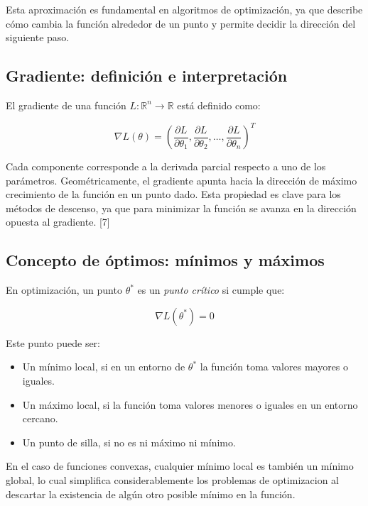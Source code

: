 \documentclass[12pt, letterpaper,conference]{IEEEtran}
\begin{document}
Esta aproximación es fundamental en algoritmos de optimización, ya que describe cómo cambia la función alrededor de un punto y permite decidir la dirección del siguiente paso.

\vspace{0.25cm}


\subsection{Gradiente: definición e interpretación}

El gradiente de una función \( L: \mathbb{R}^n \rightarrow \mathbb{R} \) está definido como:

\[
\nabla L(\theta) = \left( \frac{\partial L}{\partial \theta_1}, \frac{\partial L}{\partial \theta_2}, \dots, \frac{\partial L}{\partial \theta_n} \right)^T
\]

Cada componente corresponde a la derivada parcial respecto a uno de los parámetros. Geométricamente, el gradiente apunta hacia la dirección de máximo crecimiento de la función en un punto dado. Esta propiedad es clave para los métodos de descenso, ya que para minimizar la función se avanza en la dirección opuesta al gradiente. [7]

\vspace{0.25cm}


\subsection{Concepto de óptimos: mínimos y máximos}

En optimización, un punto \( \theta^* \) es un \textit{punto crítico} si cumple que:

\[
\nabla L(\theta^*) = 0
\]

Este punto puede ser:
\begin{itemize}
    \item Un mínimo local, si en un entorno de \( \theta^* \) la función toma valores mayores o iguales.
    \item Un máximo local, si la función toma valores menores o iguales en un entorno cercano.
    \item Un punto de silla, si no es ni máximo ni mínimo.
\end{itemize}

En el caso de funciones convexas, cualquier mínimo local es también un mínimo global, lo cual simplifica considerablemente los problemas de optimizacion al descartar la existencia de algún otro posible mínimo en la función.
\end{document}
